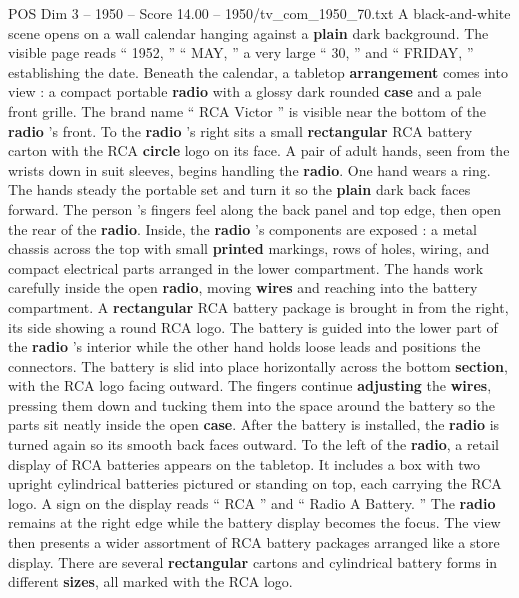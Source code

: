 \begin{textsample}{POS Dim 3 – 1950 – Score 14.00 – 1950/tv\_com\_1950\_70.txt}  \label{ex:f3_pos_008}
A black-and-white scene opens on a wall calendar hanging against a \textbf{plain} dark background.
The visible page reads “ 1952, ” “ MAY, ” a very large “ 30, ” and “ FRIDAY, ” establishing the date.
Beneath the calendar, a tabletop \textbf{arrangement} comes into view : a compact portable \textbf{radio} with a glossy dark rounded \textbf{case} and a pale front grille.
The brand name “ RCA Victor ” is visible near the bottom of the \textbf{radio} ’s front.
To the \textbf{radio} ’s right sits a small \textbf{rectangular} RCA battery carton with the RCA \textbf{circle} logo on its face.
A pair of adult hands, seen from the wrists down in suit sleeves, begins handling the \textbf{radio}.
One hand wears a ring.
The hands steady the portable set and turn it so the \textbf{plain} dark back faces forward.
The person ’s fingers feel along the back panel and top edge, then open the rear of the \textbf{radio}.
Inside, the \textbf{radio} ’s components are exposed : a metal chassis across the top with small \textbf{printed} markings, rows of holes, wiring, and compact electrical parts arranged in the lower compartment.
The hands work carefully inside the open \textbf{radio}, moving \textbf{wires} and reaching into the battery compartment.
A \textbf{rectangular} RCA battery package is brought in from the right, its side showing a round RCA logo.
The battery is guided into the lower part of the \textbf{radio} ’s interior while the other hand holds loose leads and positions the connectors.
The battery is slid into place horizontally across the bottom \textbf{section}, with the RCA logo facing outward.
The fingers continue \textbf{adjusting} the \textbf{wires}, pressing them down and tucking them into the space around the battery so the parts sit neatly inside the open \textbf{case}.
After the battery is installed, the \textbf{radio} is turned again so its smooth back faces outward.
To the left of the \textbf{radio}, a retail display of RCA batteries appears on the tabletop.
It includes a box with two upright cylindrical batteries pictured or standing on top, each carrying the RCA logo.
A sign on the display reads “ RCA ” and “ Radio A Battery. ” The \textbf{radio} remains at the right edge while the battery display becomes the focus.
The view then presents a wider assortment of RCA battery packages arranged like a store display.
There are several \textbf{rectangular} cartons and cylindrical battery forms in different \textbf{sizes}, all marked with the RCA logo.

\end{textsample}
